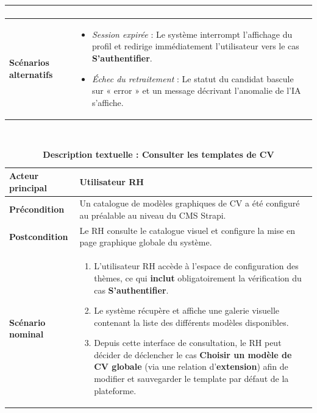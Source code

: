 \documentclass[12pt,a4paper,oneside]{report}
\begin{document}
\begin{itemize}
\begin{table}[H]
\begin{tabular}{|p{3.5cm}|p{11cm}|}
\begin{minipage}[t]{10.5cm}
\begin{enumerate}
\end{enumerate}
\end{minipage} \\
\hline
\textbf{Scénarios alternatifs} &
\begin{minipage}[t]{10.5cm}
\begin{itemize}
    \item \textit{Session expirée} : Le système interrompt l'affichage du profil et redirige immédiatement l'utilisateur vers le cas \textbf{S'authentifier}.
    \item \textit{Échec du retraitement} : Le statut du candidat bascule sur « error » et un message décrivant l'anomalie de l'IA s'affiche.
\end{itemize}
\vspace{0.3cm}

\end{minipage} \\
\hline
\end{tabular}
\end{table}

\begin{table}[H]
\centering
\caption{\textbf{Description textuelle : Consulter les templates de CV}} \\
\vspace{0.3cm}
\begin{tabular}{|p{3.5cm}|p{11cm}|}
\hline
\textbf{Acteur principal} & Utilisateur RH \\
\hline
\textbf{Précondition} & Un catalogue de modèles graphiques de CV a été configuré au préalable au niveau du CMS Strapi. \\
\hline
\textbf{Postcondition} & Le RH consulte le catalogue visuel et configure la mise en page graphique globale du système. \\
\hline
\textbf{Scénario nominal} &
\begin{minipage}[t]{10.5cm}
\begin{enumerate}
    \item L'utilisateur RH accède à l'espace de configuration des thèmes, ce qui \textbf{inclut} obligatoirement la vérification du cas \textbf{S'authentifier}.
    \item Le système récupère et affiche une galerie visuelle contenant la liste des différents modèles disponibles.
    \item Depuis cette interface de consultation, le RH peut décider de déclencher le cas \textbf{Choisir un modèle de CV globale} (via une relation d'\textbf{extension}) afin de modifier et sauvegarder le template par défaut de la plateforme.
    \vspace{0.3cm}


\end{enumerate}
\end{minipage}
\end{tabular}
\end{table}
\end{itemize}
\end{document}
